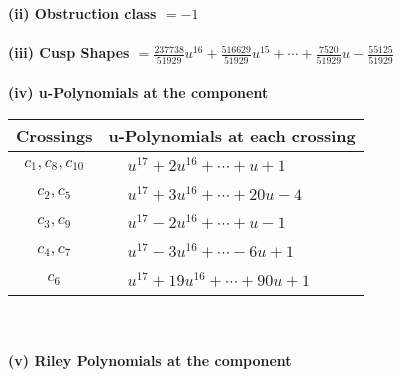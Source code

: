\documentclass[1p]{elsarticle_modified}
\theoremstyle{definition}
\begin{document}
\flushleft \textbf{(ii) Obstruction class $= -1$}\\~\\
\flushleft \textbf{(iii) Cusp Shapes $= \frac{237738}{51929} u^{16}+\frac{516629}{51929} u^{15}+\cdots+\frac{7520}{51929} u-\frac{55125}{51929}$}\\~\\
\newpage\renewcommand{\arraystretch}{1}
\flushleft \textbf{(iv) u-Polynomials at the component}\newline \\
\begin{tabular}{m{50pt}|m{274pt}}
Crossings & \hspace{64pt}u-Polynomials at each crossing \\
\hline $$\begin{aligned}c_{1},c_{8},c_{10}\end{aligned}$$&$\begin{aligned}
&u^{17}+2 u^{16}+\cdots+u+1
\end{aligned}$\\
\hline $$\begin{aligned}c_{2},c_{5}\end{aligned}$$&$\begin{aligned}
&u^{17}+3 u^{16}+\cdots+20 u-4
\end{aligned}$\\
\hline $$\begin{aligned}c_{3},c_{9}\end{aligned}$$&$\begin{aligned}
&u^{17}-2 u^{16}+\cdots+u-1
\end{aligned}$\\
\hline $$\begin{aligned}c_{4},c_{7}\end{aligned}$$&$\begin{aligned}
&u^{17}-3 u^{16}+\cdots-6 u+1
\end{aligned}$\\
\hline $$\begin{aligned}c_{6}\end{aligned}$$&$\begin{aligned}
&u^{17}+19 u^{16}+\cdots+90 u+1
\end{aligned}$\\
\hline
\end{tabular}\\~\\
\newpage\renewcommand{\arraystretch}{1}
\flushleft \textbf{(v) Riley Polynomials at the component}\newline \\
\end{document}
